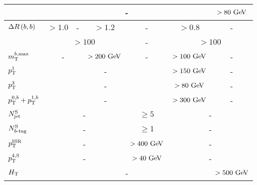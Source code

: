 \begin{landscape}
\begin{table}[htpb]
\begin{center}
\begin{tabular}{lccccccccc}
	       \mantikteightone  &    \multicolumn{8}{c}{-}  & $>80 \gev$  \\ 
	       \midrule
	       $\Delta R\left(b,b\right)$                       & $>1.0$ & \multicolumn{2}{c}{-}& \multicolumn{3}{c}{$>1.2$} & - & $>0.8$ & - \\
	       \mtbmin              & \multicolumn{6}{c}{$>100\,$\gev} & - &  \multicolumn{2}{c}{$>100\,$\gev} \\ 
	       $m_{\mathrm{T}}^{b,\mathrm{max}}$                        & \multicolumn{3}{c}{-}& \multicolumn{3}{c}{$>200\gev$} & - & $>100\gev$ & - \\
	       \midrule
	       $p_{\mathrm{T}}^{1}$                        & \multicolumn{7}{c}{-} & $>150\gev$ & - \\
	       $p_{\mathrm{T}}^{3}$                        & \multicolumn{7}{c}{-} & $>80\gev$ & - \\
	       $p_{\mathrm{T}}^{0,b}+p_{\mathrm{T}}^{1,b}$                        & \multicolumn{7}{c}{-} & $>300\gev$ & - \\
	       \midrule
	       $N_{\mathrm{jet}}^{\mathrm{S}}$         & \multicolumn{6}{c}{-}& $ \ge 5$ & \multicolumn{2}{c}{-} \\
	       $N_{b\textrm{-tag}}^{\mathrm{S}}$         & \multicolumn{6}{c}{-}& $ \ge 1$ & \multicolumn{2}{c}{-} \\
	       $p_{\mathrm{T}}^{\mathrm{ISR}}$         & \multicolumn{6}{c}{-}& $>400\gev$ & \multicolumn{2}{c}{-} \\
	       $p_{\mathrm{T}}^{4,\mathrm{S}}$         & \multicolumn{6}{c}{-}& $>40\gev$ & \multicolumn{2}{c}{-} \\
	       $H_{\mathrm{T}}$         & \multicolumn{8}{c}{-}& $>500\gev$ \\
	       \bottomrule
	    \end{tabular}
	  \end{center}
	  \label{tab:selectionCRTs}
	\end{table}
	\end{landscape}


